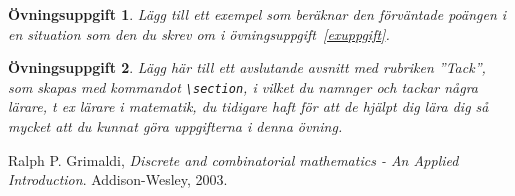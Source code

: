 \documentclass[12pt,a4wide]{article}
\theoremstyle{uppgiftsstil}
\newcommand{\ovningstext}{Övningsuppgift}
\newtheorem{ovning}{\ovningstext}
\newenvironment{uppgift}{\begin{framed}\begin{ovning}}%
                        {\end{ovning}\end{framed}}
\theoremstyle{avklaradstil}
\begin{document}
\begin{uppgift}
  Lägg till ett exempel som beräknar den förväntade poängen i en
  situation som den du skrev om i övningsuppgift~\ref{exuppgift}. 
\end{uppgift}

\begin{uppgift}
  Lägg här till ett avslutande avsnitt med rubriken ''Tack'', som
  skapas med kommandot \verb|\section|, i vilket
  du namnger och tackar några lärare, t ex lärare i matematik, du
  tidigare haft för att de hjälpt dig lära dig så mycket att du kunnat
  göra uppgifterna i denna övning. 
\end{uppgift}
%
\begin{thebibliography}{99}    %
%
    Ralph P. Grimaldi, \emph{Discrete and combinatorial mathematics -
    An Applied Introduction}. Addison-Wesley, 2003. 
%
\end{thebibliography}
%
\end{document}
